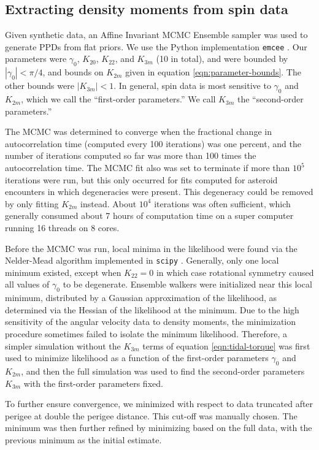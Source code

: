 \documentclass[fleqn,usenatbib]{mnras}
\begin{document}
\subsection{Extracting density moments from spin data}
\label{sec:fit}
Given synthetic data, an Affine Invariant MCMC Ensemble sampler was used to generate PPDs from flat priors. We use the Python implementation \texttt{emcee} \cite{foreman2013emcee}. Our parameters were $\gamma_0$, $K_{20}$, $K_{22}$, and $K_{3m}$ (10 in total), and were bounded by $|\gamma_0| < \pi/4$, and bounds on $K_{2 m}$ given in equation \ref{eqn:parameter-bounds}. The other bounds were $|K_{3m}| < 1$. In general, spin data is most sensitive to $\gamma_0$ and $K_{2m}$, which we call the ``first-order parameters.'' We call $K_{3m}$ the ``second-order parameters.''

The MCMC was determined to converge when the fractional change in autocorrelation time (computed every 100 iterations) was one percent, and the number of iterations computed so far was more than 100 times the autocorrelation time. The MCMC fit also was set to terminate if more than $10^5$ iterations were run, but this only occurred for fits computed for asteroid encounters in which degeneracies were present. This degeneracy could be removed by only fitting $K_{2m}$ instead. About $10^4$ iterations was often sufficient, which generally consumed about 7 hours of computation time on a super computer running 16 threads on 8 cores.

Before the MCMC was run, local minima in the likelihood were found via the Nelder-Mead algorithm implemented in \texttt{scipy} \cite{Gao2012}. Generally, only one local minimum existed, except when $K_{22}=0$ in which case rotational symmetry caused all values of $\gamma_0$ to be degenerate. Ensemble walkers were initialized near this local minimum, distributed by a Gaussian approximation of the likelihood, as determined via the Hessian of the likelihood at the minimum. Due to the high sensitivity of the angular velocity data to density moments, the minimization procedure sometimes failed to isolate the minimum likelihood. Therefore, a simpler simulation without the $K_{3m}$ terms of equation \ref{eqn:tidal-torque} was first used to minimize likelihood as a function of the first-order parameters $\gamma_0$ and $K_{2m}$, and then the full simulation was used to find the second-order parameters $K_{3m}$ with the first-order parameters fixed.

To further ensure convergence, we minimized with respect to data truncated after perigee at double the perigee distance. This cut-off was manually chosen. The minimum was then further refined by minimizing based on the full data, with the previous minimum as the initial estimate.
\end{document}

